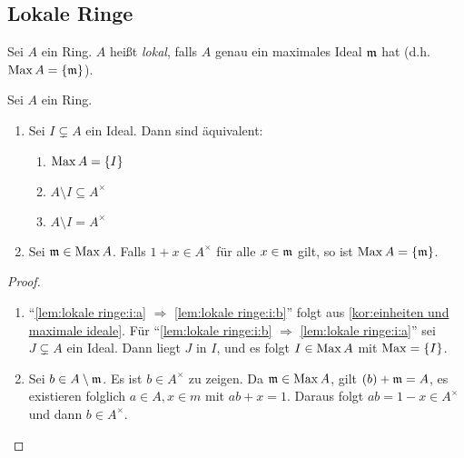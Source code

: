 \documentclass[12pt,a4paper]{scrartcl}
\theoremstyle{cplain}
\theoremstyle{cdef}
\begin{document}
\subsection{Lokale Ringe}
\begin{defi} \label{def1.5}
	Sei $A$ ein Ring. $A$ heißt \emph{lokal}, falls $A$ genau ein maximales Ideal $\mathfrak{m}$ hat (d.h. $\operatorname{Max} A = \{\mathfrak{m}\}$).
\end{defi}
\begin{lem} \label{lem:lokale ringe}
	Sei $A$ ein Ring.
	\begin{enumerate}
		\item \label{lem:lokale ringe:i} Sei $I \subsetneq A$ ein Ideal. Dann sind äquivalent:
		      \begin{enumerate}
			      \item $\operatorname{Max} A = \{I\}$ \label{lem:lokale ringe:i:a}
			      \item $A \setminus I \subseteq A^{\times}$ \label{lem:lokale ringe:i:b}
			      \item $A \setminus I = A^{\times}$ \label{lem:lokale ringe:i:c}
		      \end{enumerate}
		\item \label{lem:lokale ringe:ii} Sei $\mathfrak{m} \in \operatorname{Max} A$. Falls $1+x \in A^{\times}$ für alle $x \in \mathfrak{m}$ gilt, so ist $\operatorname{Max} A=\{ \mathfrak{m} \}$.
	\end{enumerate}
    \begin{proof}
        \leavevmode
		\begin{enumerate}[label=\ref{lem:lokale ringe:\roman*}]
			\item \enquote{\ref{lem:lokale ringe:i:a} $\Rightarrow$ \ref{lem:lokale ringe:i:b}} folgt aus \cref{kor:einheiten und maximale ideale}. Für \enquote{\ref{lem:lokale ringe:i:b} $\Rightarrow$ \ref{lem:lokale ringe:i:a}} sei $J \subsetneq A$ ein Ideal. Dann liegt $J$ in $I$, und es folgt $I \in \operatorname{Max} A$ mit $\operatorname{Max} = \{I\}$.
			\item Sei $b \in A \setminus \mathfrak{m}$. Es ist $b \in A^{\times}$ zu zeigen. Da $\mathfrak{m} \in \operatorname{Max} A$, gilt $(b)+\mathfrak{m}=A$, es existieren folglich $a \in A, x\in m$ mit $ab+x=1$. Daraus folgt $ab=1-x \in A^{\times}$ und dann $b \in A^{\times}$.
            \qedhere
        \end{enumerate}
	\end{proof}
\end{lem}
\end{document}
